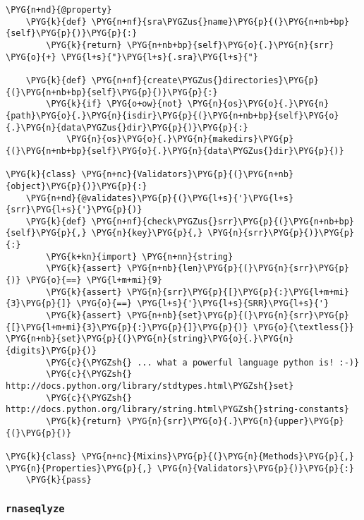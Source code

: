 \begin{Verbatim}[commandchars=\\\{\}]
    \PYG{n+nd}{@property}
    \PYG{k}{def} \PYG{n+nf}{sra\PYGZus{}name}\PYG{p}{(}\PYG{n+nb+bp}{self}\PYG{p}{)}\PYG{p}{:}
        \PYG{k}{return} \PYG{n+nb+bp}{self}\PYG{o}{.}\PYG{n}{srr} \PYG{o}{+} \PYG{l+s}{"}\PYG{l+s}{.sra}\PYG{l+s}{"}

    \PYG{k}{def} \PYG{n+nf}{create\PYGZus{}directories}\PYG{p}{(}\PYG{n+nb+bp}{self}\PYG{p}{)}\PYG{p}{:}
        \PYG{k}{if} \PYG{o+ow}{not} \PYG{n}{os}\PYG{o}{.}\PYG{n}{path}\PYG{o}{.}\PYG{n}{isdir}\PYG{p}{(}\PYG{n+nb+bp}{self}\PYG{o}{.}\PYG{n}{data\PYGZus{}dir}\PYG{p}{)}\PYG{p}{:}
            \PYG{n}{os}\PYG{o}{.}\PYG{n}{makedirs}\PYG{p}{(}\PYG{n+nb+bp}{self}\PYG{o}{.}\PYG{n}{data\PYGZus{}dir}\PYG{p}{)}

\PYG{k}{class} \PYG{n+nc}{Validators}\PYG{p}{(}\PYG{n+nb}{object}\PYG{p}{)}\PYG{p}{:}
    \PYG{n+nd}{@validates}\PYG{p}{(}\PYG{l+s}{'}\PYG{l+s}{srr}\PYG{l+s}{'}\PYG{p}{)}
    \PYG{k}{def} \PYG{n+nf}{check\PYGZus{}srr}\PYG{p}{(}\PYG{n+nb+bp}{self}\PYG{p}{,} \PYG{n}{key}\PYG{p}{,} \PYG{n}{srr}\PYG{p}{)}\PYG{p}{:}
        \PYG{k+kn}{import} \PYG{n+nn}{string}
        \PYG{k}{assert} \PYG{n+nb}{len}\PYG{p}{(}\PYG{n}{srr}\PYG{p}{)} \PYG{o}{==} \PYG{l+m+mi}{9}
        \PYG{k}{assert} \PYG{n}{srr}\PYG{p}{[}\PYG{p}{:}\PYG{l+m+mi}{3}\PYG{p}{]} \PYG{o}{==} \PYG{l+s}{'}\PYG{l+s}{SRR}\PYG{l+s}{'}
        \PYG{k}{assert} \PYG{n+nb}{set}\PYG{p}{(}\PYG{n}{srr}\PYG{p}{[}\PYG{l+m+mi}{3}\PYG{p}{:}\PYG{p}{]}\PYG{p}{)} \PYG{o}{\textless{}} \PYG{n+nb}{set}\PYG{p}{(}\PYG{n}{string}\PYG{o}{.}\PYG{n}{digits}\PYG{p}{)}
        \PYG{c}{\PYGZsh{} ... what a powerful language python is! :-)}
        \PYG{c}{\PYGZsh{} http://docs.python.org/library/stdtypes.html\PYGZsh{}set}
        \PYG{c}{\PYGZsh{} http://docs.python.org/library/string.html\PYGZsh{}string-constants}
        \PYG{k}{return} \PYG{n}{srr}\PYG{o}{.}\PYG{n}{upper}\PYG{p}{(}\PYG{p}{)}

\PYG{k}{class} \PYG{n+nc}{Mixins}\PYG{p}{(}\PYG{n}{Methods}\PYG{p}{,} \PYG{n}{Properties}\PYG{p}{,} \PYG{n}{Validators}\PYG{p}{)}\PYG{p}{:}
    \PYG{k}{pass}
\end{Verbatim}


\subsubsection{\texttt{rnaseqlyze}}
\label{index-pdf4:rnaseqlyze}

